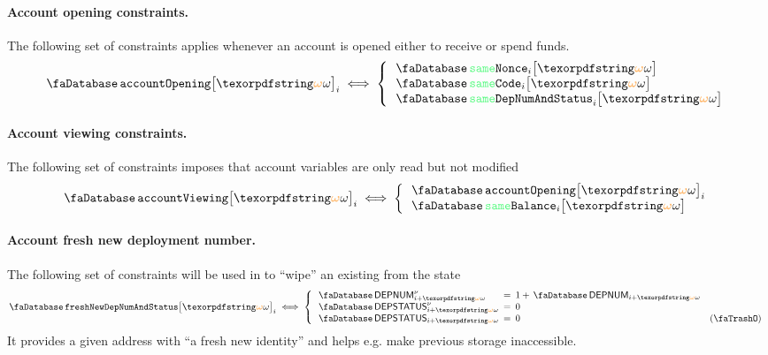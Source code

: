 \paragraph*{Account opening constraints.} The following set of constraints applies whenever an account is opened either to receive or spend funds.
\[
	\accOpening {\relof} _{i}
	\iff
	\left\{ \begin{array}{lcl}
		\accSameNonce      {i}{\relof} \\ 
		\accSameCode       {i}{\relof} \\
		\accSameDeployment {i}{\relof} \\
	\end{array} \right.
\]

\paragraph*{Account viewing constraints.} The following set of constraints imposes that account variables are only read but not modified
\[
	\accViewing {\relof} _{i}
	\iff
	\left\{ \begin{array}{lcl}
		\accOpening      {\relof} _{i} \\ 
		\accSameBalance  {i}{\relof} \\ 
	\end{array} \right.
\]

\paragraph*{Account fresh new deployment number.}
The following set of constraints will be used in  to ``wipe'' an existing from the state
\[
	\accFreshNewDeploymentStatusAndNumber{\relof}_{i}
	\iff
	\left\{ \begin{array}{lclr}
		\accDeploymentNumber\new   _{i + \relof} & \!\!\! = \!\!\! & 1 + \accDeploymentNumber  _{i + \relof} \\
		\accDeploymentStatus\new   _{i + \relof} & \!\!\! = \!\!\! & 0                                       \\
		\accDeploymentStatus       _{i + \relof} & \!\!\! = \!\!\! & 0                                        & (\trash) \\
	\end{array} \right.
\]
It provides a given address with ``a fresh new identity'' and helps e.g. make previous storage inaccessible.

